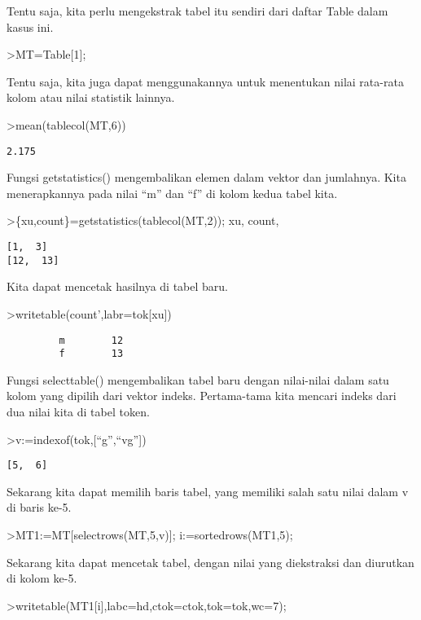 \documentclass[
]{book}
\begin{document}
Tentu saja, kita perlu mengekstrak tabel itu sendiri dari daftar Table dalam kasus ini.

\textgreater MT=Table{[}1{]};

Tentu saja, kita juga dapat menggunakannya untuk menentukan nilai rata-rata kolom atau nilai statistik lainnya.

\textgreater mean(tablecol(MT,6))

\begin{verbatim}
2.175
\end{verbatim}

Fungsi getstatistics() mengembalikan elemen dalam vektor dan jumlahnya. Kita menerapkannya pada nilai ``m'' dan ``f'' di kolom kedua tabel kita.

\textgreater\{xu,count\}=getstatistics(tablecol(MT,2)); xu, count,

\begin{verbatim}
[1,  3]
[12,  13]
\end{verbatim}

Kita dapat mencetak hasilnya di tabel baru.

\textgreater writetable(count',labr=tok{[}xu{]})

\begin{verbatim}
         m        12
         f        13
\end{verbatim}

Fungsi selecttable() mengembalikan tabel baru dengan nilai-nilai dalam satu kolom yang dipilih dari vektor indeks. Pertama-tama kita mencari indeks dari dua nilai kita di tabel token.

\textgreater v:=indexof(tok,{[}``g'',``vg''{]})

\begin{verbatim}
[5,  6]
\end{verbatim}

Sekarang kita dapat memilih baris tabel, yang memiliki salah satu nilai dalam v di baris ke-5.

\textgreater MT1:=MT{[}selectrows(MT,5,v){]}; i:=sortedrows(MT1,5);

Sekarang kita dapat mencetak tabel, dengan nilai yang diekstraksi dan diurutkan di kolom ke-5.

\textgreater writetable(MT1{[}i{]},labc=hd,ctok=ctok,tok=tok,wc=7);
\end{document}
